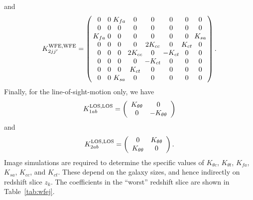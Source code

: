 \documentclass[usenatbib]{mnras}
\begin{document}
and
\begin{equation}
\setlength\arraycolsep{1.5pt}
K_{2jj'}^{\rm WFE,WFE} = \left( \begin{array}{cccccccc}
0 & 0 & K_{fa} & 0 & 0 & 0 & 0 & 0 \\
0 & 0 & 0 & 0 & 0 & 0 & 0 & 0 \\
K_{fa} & 0 & 0 & 0 & 0 & 0 & 0 & K_{sa} \\
0 & 0 & 0 & 0 & 2K_{cc} & 0 & K_{ct} & 0 \\
0 & 0 & 0 & 2K_{cc} & 0 & -K_{ct} & 0 & 0 \\
0 & 0 & 0 & 0 & -K_{ct} & 0 & 0 & 0 \\
0 & 0 & 0 & K_{ct} & 0 & 0 & 0 & 0 \\
0 & 0 & K_{sa} & 0 & 0 & 0 & 0 & 0 \\
\end{array} \right).
\end{equation}
Finally, for the line-of-sight-motion only, we have
\begin{equation}
K_{1ab}^{\rm LOS,LOS} = \left( \begin{array}{cc} K_{\theta\theta} & 0 \\ 0 & -K_{\theta\theta} \end{array} \right)
\label{eq:K1t}
\end{equation}
and
\begin{equation}
K_{2ab}^{\rm LOS,LOS} = \left( \begin{array}{cc} 0 & K_{\theta\theta} \\ K_{\theta\theta} & 0 \end{array} \right).
\label{eq:K2t}
\end{equation}
Image simulations are required to determine the specific values of
$K_{\theta c}$, $K_{\theta t}$, $K_{fa}$, $K_{sa}$, $K_{cc}$, and
$K_{ct}$. These depend on the galaxy sizes, and hence indirectly on
redshift slice $z_k$. The coefficients in the ``worst'' redshift slice
are shown in Table~\ref{tab:wfej}.
\end{document}
